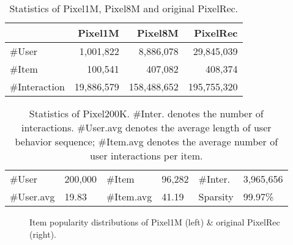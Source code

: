 \documentclass[sigconf]{acmart}
\begin{document}
	\begin{table}[t]
		\centering
		\caption{Statistics of Pixel1M, Pixel8M and original PixelRec.}
		\label{tab:ltik}
		\begin{tabular}{lrrr}
			\toprule
			& Pixel1M    &Pixel8M  & PixelRec    \\
			\midrule
			\#User &  1,001,822   &   8,886,078      &29,845,039\\
			
			\#Item  & 100,541    &  407,082        &408,374  \\
			
			\#Interaction &  19,886,579  & 158,488,652 &195,755,320  \\		
			\bottomrule
		\end{tabular}
	\end{table}
	\begin{table}[t]
		\centering
		\caption{Statistics of Pixel200K. \#Inter. denotes the number of interactions. \#User.avg denotes the average length of user behavior sequence; \#Item.avg denotes the average number of user interactions per item. }
		\label{tab:tikdata}
		\centering
		\begin{tabular}{l p{0.9cm}<{\centering} l p{0.9cm}<{\centering} l p{1cm}<{\centering}}
			\toprule
			\#User &  200,000   &\#Item  & 96,282 &\#Inter. &  3,965,656 \\
			\#User.avg  & 19.83 &\#Item.avg & 41.19 & Sparsity & 99.97\%  \\
			\bottomrule
		\end{tabular}
	\end{table}


	\begin{figure}[t]
		\centering
		\caption{Item popularity distributions of Pixel1M (left) \& original PixelRec (right).}
  
		\label{fig:Ldistfigure}
	\end{figure}
\end{document}
